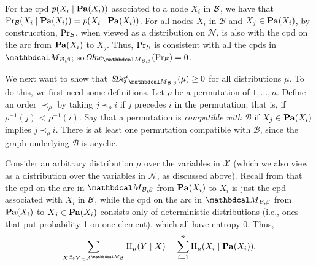 \begin{subappendices}
\begin{lproof}\label{proof:bns-are-pdgs}
  For the cpd $p(X_i \mid \mathop{\mathbf{Pa}}(X_i))$ associated to a node $X_i$ in 
$\cal B$, we have that $\Pr_{\cal B}(X_i
\mid \mathop{\mathbf{Pa}}(X_i)) = p(X_i \mid \mathop{\mathbf{Pa}}(X_i))$.  
For all nodes $X_i$ in $\mathcal B$ and $X_j \in \mathop{\mathbf{Pa}}(X_i)$, 
by construcction, $\Pr_{\cal B}$, when viewed as a distribution on
$\mathcal N$, is also with the cpd on the arc from $\mathop{\mathbf{Pa}}(X_i)$ to
$X_j$.
Thus, $\Pr_{\cal B}$ is consistent with all the cpds in
$\PDGof{\mathcal B, \beta}$;
so$\OInc_{\PDGof{\mathcal B,\beta}}(\Pr_{\cal B}) = 0$.

We next want to show  that $\SDef_{\PDGof{\mathcal B,\beta}}(\mu) \ge 0$ for all
distributions $\mu$.  To do this, we first need some definitions.
Let $\rho$ be a permutation of $1, \ldots,  n$.  Define an order
$\prec_{\rho}$ by taking $j \prec_{\rho} i$ if $j$ precedes $i$ in the
permutation; that is, if 
$\rho^{-1}(j)$ < $\rho^{-1}(i)$. Say that a permutation is \emph{compatible with
  $\mathcal B$} if $X_j \in \mathop{\mathbf{Pa}}(X_i)$ implies $j \prec_{\rho} i$.   There
is at least one permutation compatible with $\mathcal B$, since 
the graph underlying $\mathcal B$ is acyclic.
  
Consider an arbitrary distribution $\mu$ over the variables in
$\mathcal X$ (which we also view as a distribution over the variables
in $\mathcal N$, as discussed above).
Recall from 
that the cpd on the arc in $\PDGof{{\cal B},\beta}$ from $\mathop{\mathbf{Pa}}(X_i)$ to $X_i$
is just the cpd associated with $X_i$ in ${\cal B}$, while the cpd on
the arc in $\PDGof{{\cal B},\beta}$ from $\mathop{\mathbf{Pa}}(X_i)$ to $X_j \in \mathop{\mathbf{Pa}}(X_i)$
consists only of deterministic distributions (i.e., ones that put
probability 1 on one element), which all have entropy 0.  
Thus,
\begin{equation}\label{eq:fact2}
\sum_{\ed aXY \in \Ar^{\PDGof{\mathcal B}}} \H_\mu(Y\mid
X)=\sum_{i=1}^n \H_\mu(X_i \mid \Pa(X_i)). 
\end{equation}


\end{lproof}
\end{subappendices}
